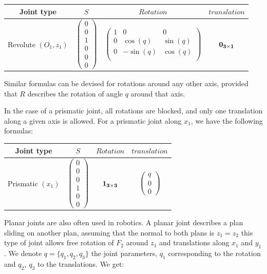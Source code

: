 \begin{tabular}{|c|c|c|c|}
  \hline
  Joint type & $S$ & $Rotation$ & $translation$ \\
  \hline
  Revolute $(O_1,z_1)$
  &
  $\begin{pmatrix}
    0 \\ 0 \\ 1 \\ 0 \\ 0 \\ 0
  \end{pmatrix}$
  &
  $\begin{pmatrix}
    1 & 0 & 0 \\
    0 & \cos(q) & \sin(q) \\
    0 & -\sin(q) & \cos(q) \\
  \end{pmatrix}$
  &
  $\bf{0}_{3\times1}$
  \\
  \hline
\end{tabular}

Similar formulas can be devised for rotations around any other axis, provided that $R$ describes the rotation of angle $q$ around that axis.

In the case of a prismatic joint, all rotations are blocked, and only one translation along a given axis is allowed.
For a prismatic joint along $x_1$, we have the following formulas:

\begin{tabular}{|c|c|c|c|}
  \hline
  Joint type & $S$ & $Rotation$ & $translation$ \\
  \hline
  Prismatic $(x_1)$
  &
  $\begin{pmatrix}
    0 \\ 0 \\ 0 \\ 1 \\ 0 \\ 0
  \end{pmatrix}$
  &
  $\bf{1}_{3\times3} $
  &
  $\begin{pmatrix}
    q \\ 0 \\ 0
  \end{pmatrix}$
  \\
  \hline
\end{tabular}

Planar joints are also often used in robotics. A planar joint describes a plan sliding on another plan, assuming that the normal to both plans is $z_1 = z_2$ this type of joint allows free rotation of $F_2$ around $z_1$ and translations along $x_1$ and $y_1$. We denote $q = \{q_1, q_2, q_3\}$ the joint parameters, $q_1$ corresponding to the rotation and $q_2,\ q_3$ to the translations. We get:

